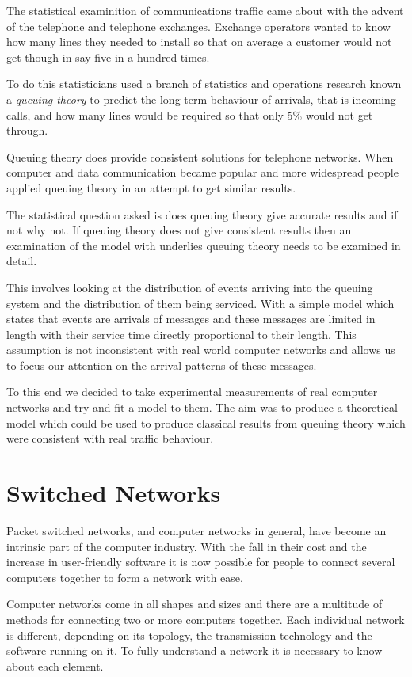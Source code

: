 The statistical examinition of communications traffic came about with
the advent of the telephone and telephone exchanges.  Exchange
operators wanted to know how many lines they needed to install so that
on average a customer would not get though in say five in a hundred
times.

To do this statisticians used a branch of statistics and operations
research known a {\em queuing theory} to predict the long term
behaviour of arrivals, that is incoming calls, and how many lines
would be required so that only 5\% would not get through.

Queuing theory does provide consistent solutions for telephone
networks.  When computer and data communication became popular and
more widespread people applied queuing theory in an attempt to get
similar results.

The statistical question asked is does queuing theory give accurate
results and if not why not.  If queuing theory does not give
consistent results then an examination of the model with underlies
queuing theory needs to be examined in detail.

This involves looking at the distribution of events arriving into the
queuing system and the distribution of them being serviced.  With a
simple model which states that events are arrivals of messages and
these messages are limited in length with their service time directly
proportional to their length.  This assumption is not inconsistent
with real world computer networks and allows us to focus our attention
on the arrival patterns of these messages.

To this end we decided to take experimental measurements of real
computer networks and try and fit a model to them.  The aim was to
produce a theoretical model which could be used to produce classical
results from queuing theory which were consistent with real traffic
behaviour.

\section{Switched Networks}

Packet switched networks, and computer networks in general, have
become an intrinsic part of the computer industry.  With the fall in
their cost and the increase in user-friendly software it is now
possible for people to connect several computers together to form a
network with ease.

Computer networks come in all shapes and sizes and there are a
multitude of methods for connecting two or more computers together.
Each individual network is different, depending on its topology, the
transmission technology and the software running on it.  To fully
understand a network it is necessary to know about each element.

